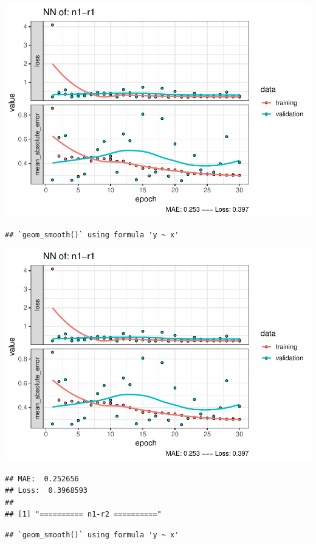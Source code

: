 \documentclass[
]{article}
\begin{document}
\includegraphics{project-code_files/figure-latex/unnamed-chunk-18-11.pdf}

\begin{verbatim}
## `geom_smooth()` using formula 'y ~ x'
\end{verbatim}

\includegraphics{project-code_files/figure-latex/unnamed-chunk-18-12.pdf}

\begin{verbatim}
## MAE:  0.252656
## Loss:  0.3968593 
## 
## [1] "========== n1-r2 =========="
\end{verbatim}

\begin{verbatim}
## `geom_smooth()` using formula 'y ~ x'
\end{verbatim}
\end{document}
